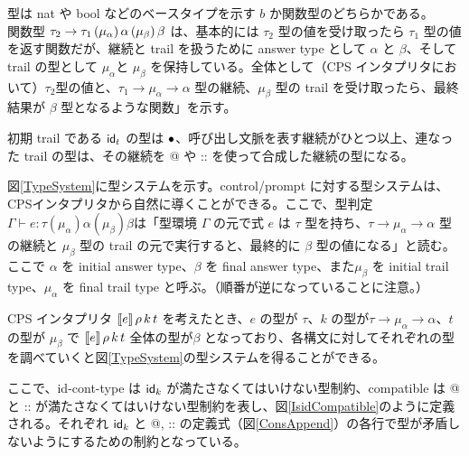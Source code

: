 型は nat や bool などのベースタイプを示す $b$ か関数型のどちらかである。\\
関数型 ${\tau_2}\rightarrow{\tau_1}\,(\mu_{\alpha})\,\alpha\,(\mu_{\beta})\,\beta$ は、基本的には $\tau_2$ 型の値を受け取ったら $\tau_1$ 型の値を返す関数だが、継続と trail を扱うために answer type として $\alpha$ と $\beta$、そして trail の型として $\mu_{\alpha}$と $\mu_{\beta}$ を保持している。全体として（CPS インタプリタにおいて）$\tau_2$型の値と、$\tau_1 \rightarrow \mu_{\alpha} \rightarrow \alpha$ 型の継続、$\mu_{\beta}$ 型の trail を受け取ったら、最終結果が $\beta$ 型となるような関数」を示す。

初期 trail である $\textsf{id}_t$ の型は $\bullet$、呼び出し文脈を表す継続がひとつ以上、連なった trail の型は、その継続を @ や :: を使って合成した継続の型になる。

図\ref{TypeSystem}に型システムを示す。control/prompt に対する型システムは、CPSインタプリタから自然に導くことができる\cite{FSCD2021}。ここで、型判定$\Gamma \vdash e : \tau(\mu_{\alpha})\alpha(\mu_{\beta})\beta$は「型環境 $\Gamma$ の元で式 $e$ は $\tau$ 型を持ち、$\tau \rightarrow \mu_{\alpha} \rightarrow \alpha$ 型の継続と $\mu_{\beta}$ 型の trail の元で実行すると、最終的に $\beta$ 型の値になる」と読む。
ここで $\alpha$ を initial answer type、$\beta$ を final answer type、また$\mu_{\beta}$ を initial trail type、$\mu_{\alpha}$ を final trail type と呼ぶ。（順番が逆になっていることに注意。）

CPS インタプリタ $[\![{e}]\!]\,\rho\,k\,t$ を考えたとき、$e$ の型が $\tau$、$k$ の型が$\tau \rightarrow \mu_{\alpha} \rightarrow \alpha$、$t$ の型が $\mu_{\beta}$ で $[\![{e}]\!]\,\rho\,k\,t$ 全体の型が$\beta$ となっており、各構文に対してそれぞれの型を調べていくと図\ref{TypeSystem}の型システムを得ることができる。

ここで、\textsf{id-cont-type} は $\textsf{id}_k$ が満たさなくてはいけない型制約、\textsf{compatible} は @ と :: が満たさなくてはいけない型制約を表し、図\ref{IsidCompatible}のように定義される。それぞれ $\textsf{id}_k$ と @, :: の定義式（図\ref{ConsAppend}）の各行で型が矛盾しないようにするための制約となっている。

